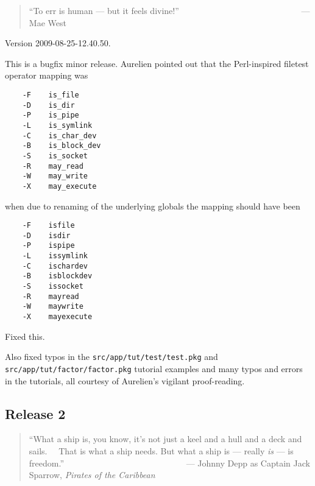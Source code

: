 \begin{quote}\begin{tiny}
        ``To err is human --- but it feels divine!''\newline
\newline
         ~~~~~~~~~~~~~~~~~~~~~~~~~~~~--- Mae West
\end{tiny}\end{quote}

Version 2009-08-25-12.40.50.

This is a bugfix minor release.  Aurelien pointed out that the Perl-inspired 
filetest operator mapping was

\begin{verbatim}
    -F    is_file
    -D    is_dir
    -P    is_pipe
    -L    is_symlink
    -C    is_char_dev
    -B    is_block_dev
    -S    is_socket
    -R    may_read
    -W    may_write
    -X    may_execute
\end{verbatim}

when due to renaming of the underlying globals the mapping should have been

\begin{verbatim}
    -F    isfile
    -D    isdir
    -P    ispipe
    -L    issymlink
    -C    ischardev
    -B    isblockdev
    -S    issocket
    -R    mayread
    -W    maywrite
    -X    mayexecute
\end{verbatim}

Fixed this.

Also fixed typos in the {\tt src/app/tut/test/test.pkg} 
and {\tt src/app/tut/factor/factor.pkg} tutorial 
examples and many typos and errors in the tutorials, all courtesy of Aurelien's vigilant 
proof-reading.

\cutend*

\subsection{Release 2}
\label{section:src:release-2}

\begin{quote}\begin{tiny}
        ``What a ship is, you know, it's not just a keel and a hull and a deck and sails.\newline
        ~~That is what a ship needs. But what a ship is --- really {\it is} --- is freedom.''\newline
\newline
         ~~~~~~~~~~~~~~~~~~~~~~~~~~~~--- Johnny Depp as Captain Jack Sparrow, {\em Pirates of the Caribbean}
\end{tiny}\end{quote}

